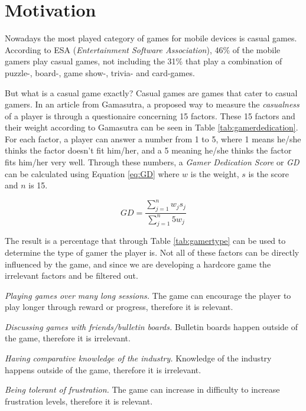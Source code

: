 \section{Motivation} \label{sec:motivation}
Nowadays the most played category of games for mobile devices is casual games.
According to ESA\cite{ESA}\cite{ESApdf} (\textit{Entertainment Software Association}), 46\% of the mobile gamers play casual games, not including the 31\% that play a combination of puzzle-, board-, game show-, trivia- and card-games.

But what is a casual game exactly?
Casual games are games that cater to casual gamers.
In an article from Gamasutra, a proposed way to measure the \textit{casualness} of a player is through a questionaire concerning 15 factors\cite{casual_vs_hardcore}.
These 15 factors and their weight according to Gamasutra can be seen in Table \ref{tab:gamerdedication}\cite{casual_vs_hardcore}.
For each factor, a player can answer a number from 1 to 5, where 1 means he/she thinks the factor doesn't fit him/her, and a 5 meaning he/she thinks the factor fits him/her very well.
Through these numbers, a \emph{Gamer Dedication Score} or \emph{GD} can be calculated using Equation \ref{eq:GD} where $w$ is the weight, $s$ is the score and $n$ is 15.

\begin{equation}\label{eq:GD}
GD = \frac{\sum\limits_{j=1}^n w_j s_j}{\sum\limits_{j=1}^n 5 w_j}
\end{equation}

The result is a percentage that through Table \ref{tab:gamertype} can be used to determine the type of gamer the player is\cite{casual_vs_hardcore}.
Not all of these factors can be directly influenced by the game, and since we are developing a hardcore game the irrelevant factors and be filtered out.

\emph{Playing games over many long sessions.}
The game can encourage the player to play longer through reward or progress, therefore it is relevant.

\emph{Discussing games with friends/bulletin boards.}
Bulletin boards happen outside of the game, therefore it is irrelevant. 

\emph{Having comparative knowledge of the industry.}
Knowledge of the industry happens outside of the game, therefore it is irrelevant.

\emph{Being tolerant of frustration.}
The game can increase in difficulty to increase frustration levels, therefore it is relevant.

